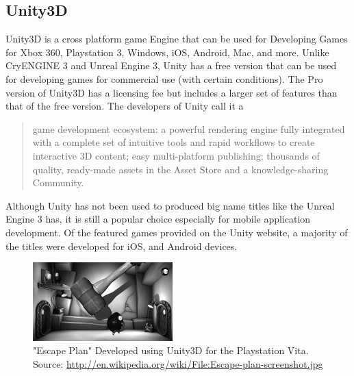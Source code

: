 \subsection{Unity3D}
Unity3D is a cross platform game Engine that can be used for Developing Games for Xbox 360, Playstation 3, Windows, iOS, Android, Mac, and more. Unlike CryENGINE 3 and Unreal Engine 3, Unity has a free version that can be used for developing games for commercial use (with certain conditions). The Pro version of Unity3D has a licensing fee but includes a larger set of features than that of the free version. The developers of Unity call it a 
\begin{quote}
game development ecosystem: a powerful rendering engine fully integrated with a complete set of intuitive tools and rapid workflows to create interactive 3D content; easy multi-platform publishing; thousands of quality, ready-made assets in the Asset Store and a knowledge-sharing Community. \cite{unity3d}
\end{quote}
Although Unity has not been used to produced big name titles like the Unreal Engine 3 has, it is still a popular choice especially for mobile application development. Of the featured games provided on the Unity website, a majority of the titles were developed for iOS, and Android devices.
\begin{figure}[h!]
  \centering \includegraphics[width=0.48\textwidth]{Images/Escape-plan-screenshot.jpg}
	\caption{"Escape Plan" Developed using Unity3D for the Playstation Vita. Source: \url{http://en.wikipedia.org/wiki/File:Escape-plan-screenshot.jpg}}
\end{figure}


